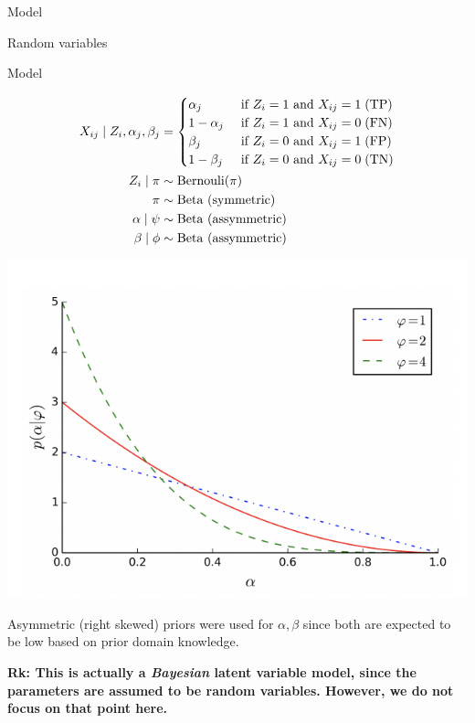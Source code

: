 \documentclass[10pt]{beamer}
\begin{document}
\begin{frame}{Model}
\begin{sblock}{Random variables}
\end{sblock}

\begin{sblock}{Model}

\begin{minipage}{.65\textwidth}
\begin{align*}
X_{ij} \; | \; Z_{i}, \alpha_j, \beta_j &= 
\begin{cases}
\alpha_j&  \text{ if } Z_i  =1   \text{ and }  X_{ij} = 1  \;  \text{(TP)} \\
1 - \alpha_j&  \text{ if }  Z_i  =1    \text{ and } X_{ij} = 0     \; \text{(FN)} \\
\beta_j &  \text{ if }  Z_i  =0  \text{ and } X_{ij} = 1     \; \text{(FP)} \\
1 - \beta_j& \text{ if } Z_i  =0  \text{ and } X_{ij} = 0    \;  \text{(TN)} \\
\end{cases} \\
Z_i \; | \; \pi & \sim \text{Bernouli}(\pi) \\
\pi &\sim \text{Beta (symmetric)} \\
\alpha \; | \; \psi &\sim \text{Beta (assymmetric)} \\
\beta \; | \; \phi &\sim \text{Beta (assymmetric)} \\
\end{align*}
\end{minipage}
\hfill 
\begin{minipage}{.3\textwidth}
\begin{center}
\includegraphics[width=\textwidth]{images/assymmetric_beta_kantchelian}

\scriptsize Asymmetric (right skewed) priors were used for $\alpha, \beta$ since both are expected to be low based on prior domain knowledge. 
\end{center}

\end{minipage}

\end{sblock}

\vfill \vfill \vfill \bf{Rk:} This is actually a \textit{Bayesian} latent variable model, since the parameters are assumed to be random variables.  However, we do not focus on that point here.
\end{frame}
\end{document}
